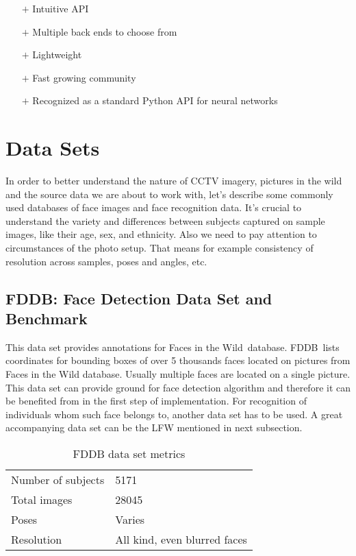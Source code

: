 \begin{itemize}
    \item[$\boldsymbol{+}$] Intuitive API
    \item[$\boldsymbol{+}$] Multiple back ends to choose from
    \item[$\boldsymbol{+}$] Lightweight
    \item[$\boldsymbol{+}$] Fast growing community
    \item[$\boldsymbol{+}$] Recognized as a standard Python API for neural networks
\end{itemize}

\section{Data Sets}

In order to better understand the nature of CCTV imagery, pictures in the wild and the source data we are about to work with, let's describe some commonly used databases of face images and face recognition data. It's crucial to understand the variety and differences between subjects captured on sample images, like their age, sex, and ethnicity. Also we need to pay attention to circumstances of the photo setup. That means for example consistency of resolution across samples, poses and angles, etc.

\subsection{FDDB: Face Detection Data Set and Benchmark}

This data set provides annotations for Faces in the Wild\,\cite{fiw} database. FDDB\,\cite{fddb} lists coordinates for bounding boxes of over 5 thousands faces located on pictures from Faces in the Wild database. Usually multiple faces are located on a single picture. This data set can provide ground for face detection algorithm and therefore it can be benefited from in the first step of implementation. For recognition of individuals whom such face belongs to, another data set has to be used. A great accompanying data set can be the LFW mentioned in next subsection.

\begin{table}[ht]
    \centering
    \caption{FDDB data set metrics}

    \begin{tabularx}{0.75\textwidth}{l|l}
        \toprule
        Number of subjects & \num{5171} \\
        Total images &  \num{28045} \\
        Poses & Varies \\
        Resolution & All kind, even blurred faces \\
        \bottomrule
    \end{tabularx}
\end{table}


